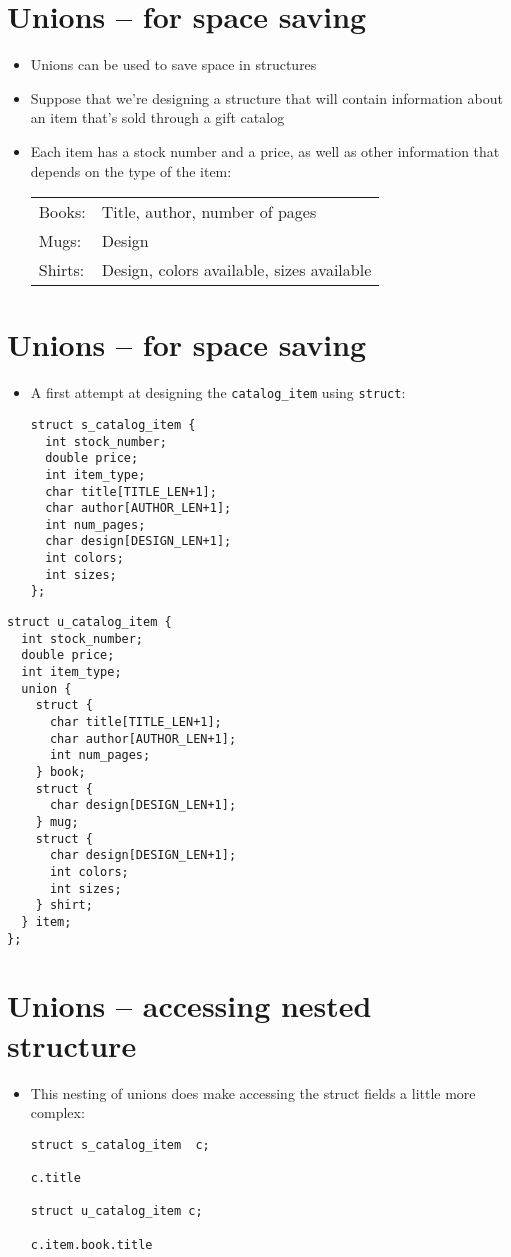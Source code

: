 \documentclass{article}
\begin{document}
\section{Unions -- for space saving}
\begin{itemize}
\item Unions can be used to save space in structures
\item Suppose that we're designing a structure that will contain information about an item that's sold through a gift catalog
\item Each item has a stock number and a price, as well as other information that depends on the type of the item:
\begin{tabular}{ll}
Books: & Title, author, number of pages\\
Mugs: & Design\\
Shirts: & Design, colors available, sizes available\\
\end{tabular}
\end{itemize}



\section{Unions -- for space saving}
\begin{itemize}
\item A first attempt at designing the \verb!catalog_item! using \verb!struct!:
\begin{verbatim}
struct s_catalog_item {
  int stock_number;
  double price;
  int item_type;
  char title[TITLE_LEN+1];
  char author[AUTHOR_LEN+1];
  int num_pages;
  char design[DESIGN_LEN+1];
  int colors;
  int sizes;
};
\end{verbatim}
\end{itemize}



\begin{Verbatim}
struct u_catalog_item {
  int stock_number;
  double price;
  int item_type;
  union {
    struct {
      char title[TITLE_LEN+1];
      char author[AUTHOR_LEN+1];
      int num_pages;
    } book;
    struct {
      char design[DESIGN_LEN+1];
    } mug;
    struct {
      char design[DESIGN_LEN+1];
      int colors;
      int sizes;
    } shirt;
  } item;
};
\end{Verbatim}



\section{Unions -- accessing nested structure}
\begin{itemize}
\item This nesting of unions does make accessing the struct fields a little more complex: 
\begin{verbatim}
struct s_catalog_item  c; 

c.title

struct u_catalog_item c;

c.item.book.title
\end{verbatim}
\end{itemize}
\end{document}
